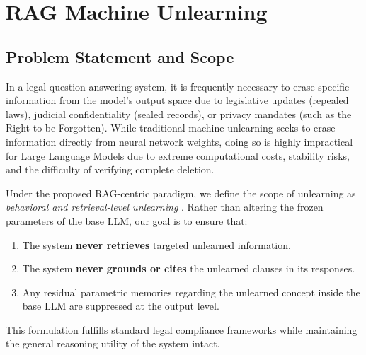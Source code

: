 \section{RAG Machine Unlearning}

\subsection{Problem Statement and Scope}
In a legal question-answering system, it is frequently necessary to erase specific information from the model's output space due to legislative updates (repealed laws), judicial confidentiality (sealed records), or privacy mandates (such as the Right to be Forgotten). While traditional machine unlearning seeks to erase information directly from neural network weights, doing so is highly impractical for Large Language Models due to extreme computational costs, stability risks, and the difficulty of verifying complete deletion.

Under the proposed RAG-centric paradigm, we define the scope of unlearning as \textit{behavioral and retrieval-level unlearning} \parencite{11207222}. Rather than altering the frozen parameters of the base LLM, our goal is to ensure that:
\begin{enumerate}
    \item The system \textbf{never retrieves} targeted unlearned information.
    \item The system \textbf{never grounds or cites} the unlearned clauses in its responses.
    \item Any residual parametric memories regarding the unlearned concept inside the base LLM are suppressed at the output level.
\end{enumerate}
This formulation fulfills standard legal compliance frameworks while maintaining the general reasoning utility of the system intact.

